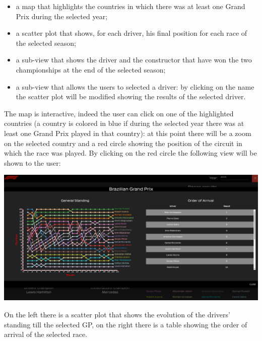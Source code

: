 \documentclass[11pt,twocolumn,letterpaper]{article}
\begin{document}
\begin{itemize}
	\item a map that highlights the countries in which there was at least one Grand Prix during the selected year;
	\item a scatter plot that shows, for each driver, his final position for each race of the selected season;
	\item a sub-view that shows the driver and the constructor that have won the two championships at the end of the selected season;
	\item a sub-view that allows the users to selected a driver: by clicking on the name the scatter plot will be modified showing the results of the selected driver.
\end{itemize}

The map is interactive, indeed the user can click on one of the highlighted countries (a country is colored in blue if during the selected year there was at least one Grand Prix
played in that country): at this point there will be a zoom on the selected country and a red circle showing the position of the circuit in which the race was played. By clicking
on the red circle the following view will be shown to the user:

\begin{center}
	\centering
	\includegraphics[width=\columnwidth]{map-clicked}
\end{center}

On the left there is a scatter plot that shows the evolution of the drivers' standing till the selected GP, on the right there is a table showing the order of arrival of the selected
race.
\end{document}

